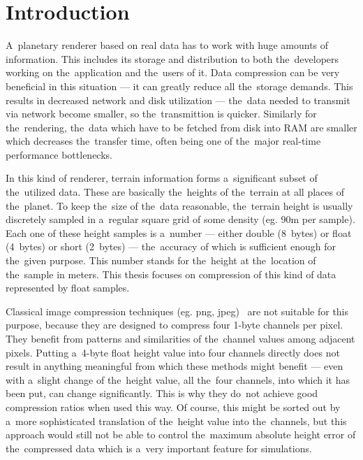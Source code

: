 \chapter*{Introduction}\label{chap:introduction}

A~planetary renderer based on real data has to work with huge amounts of information. This includes its storage and distribution to both the~developers working on the~application and the~users of it. Data compression can be very beneficial in this situation --- it can greatly reduce all the~storage demands. This results in decreased network and disk utilization --- the~data needed to transmit via network become smaller, so the~transmittion is quicker. Similarly for the~rendering, the~data which have to be fetched from disk into RAM are smaller which decreases the~transfer time, often being one of the~major real-time performance bottlenecks. 

In this kind of renderer, terrain information forms a~significant subset of the~utilized data. These are basically the~heights of the~terrain at all places of the~planet. To keep the~size of the~data reasonable, the~terrain height is usually discretely sampled in a~regular square grid of some density (eg. 90m per sample). Each one of these height samples is a~number --- either double (8~bytes) or float (4~bytes) or short (2~bytes) --- the~accuracy of which is sufficient enough for the~given purpose. This number stands for the~height at the~location of the~sample in meters. This thesis focuses on compression of this kind of data represented by float samples. 

Classical image compression techniques (eg. png, jpeg)~\cite{jpeg, basicFormats} are not suitable for this purpose, because they are designed to compress four 1-byte channels per pixel. They benefit from patterns and similarities of the~channel values among adjacent pixels. Putting a~4-byte float height value into four channels directly does not result in anything meaningful from which these methods might benefit ---  even with a~slight change of the~height value, all the~four channels, into which it has been put, can change significantly. This is why they do~not achieve good compression ratios when used this way. Of course, this might be sorted out by a~more sophisticated translation of the~height value into the~channels, but this approach would still not be able to control the~maximum absolute height error of the~compressed data which is a~very important feature for simulations. 

